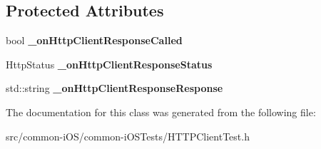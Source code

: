 \subsection*{Protected Attributes}
\begin{DoxyCompactItemize}
\item 
\hypertarget{class_h_t_t_p_client_delegate_test_a30e4942f9013a9f71d598586607a9654}{}\label{class_h_t_t_p_client_delegate_test_a30e4942f9013a9f71d598586607a9654} 
bool {\bfseries \+\_\+on\+Http\+Client\+Response\+Called}
\item 
\hypertarget{class_h_t_t_p_client_delegate_test_a05a0c3f76ca036d71aa787f99584f701}{}\label{class_h_t_t_p_client_delegate_test_a05a0c3f76ca036d71aa787f99584f701} 
Http\+Status {\bfseries \+\_\+on\+Http\+Client\+Response\+Status}
\item 
\hypertarget{class_h_t_t_p_client_delegate_test_a2b133a0b45eebf9f01c2e5215a92295b}{}\label{class_h_t_t_p_client_delegate_test_a2b133a0b45eebf9f01c2e5215a92295b} 
std\+::string {\bfseries \+\_\+on\+Http\+Client\+Response\+Response}
\end{DoxyCompactItemize}


The documentation for this class was generated from the following file\+:\begin{DoxyCompactItemize}
\item 
src/common-\/i\+O\+S/common-\/i\+O\+S\+Tests/H\+T\+T\+P\+Client\+Test.\+h\end{DoxyCompactItemize}
